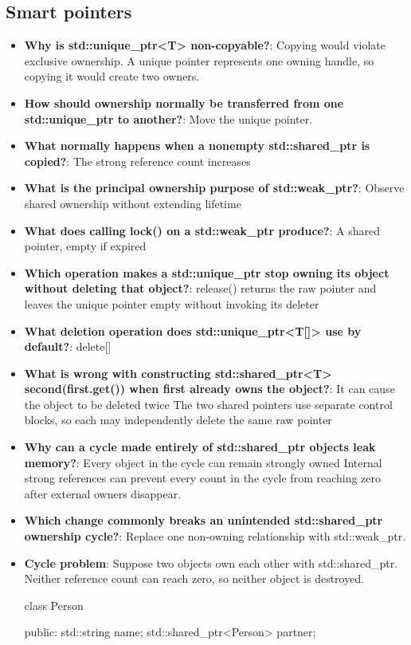 \documentclass{report}
\begin{document}
    \subsection{Smart pointers}
    \begin{itemize}
        \item \textbf{Why is std::unique\_ptr<T> non-copyable?}: Copying would violate exclusive ownership. A unique pointer represents one owning handle, so copying it would create two owners. 
        \item \textbf{How should ownership normally be transferred from one std::unique\_ptr to another?}: Move the unique pointer.
        \item \textbf{What normally happens when a nonempty std::shared\_ptr is copied?}: The strong reference count increases
        \item \textbf{What is the principal ownership purpose of std::weak\_ptr?}: Observe shared ownership without extending lifetime
        \item \textbf{What does calling lock() on a std::weak\_ptr produce?}: A shared pointer, empty if expired
        \item \textbf{Which operation makes a std::unique\_ptr stop owning its object without deleting that object?}: release() returns the raw pointer and leaves the unique pointer empty without invoking its deleter
        \item \textbf{What deletion operation does std::unique\_ptr<T[]> use by default?}: delete[]
        \item \textbf{What is wrong with constructing std::shared\_ptr<T> second(first.get()) when first already owns the object?}: It can cause the object to be deleted twice
            \bigbreak \noindent 
            The two shared pointers use separate control blocks, so each may independently delete the same raw pointer
        \item \textbf{Why can a cycle made entirely of std::shared\_ptr objects leak memory?}: Every object in the cycle can remain strongly owned
            \bigbreak \noindent 
            Internal strong references can prevent every count in the cycle from reaching zero after external owners disappear.
        \item \textbf{Which change commonly breaks an unintended std::shared\_ptr ownership cycle?}: Replace one non-owning relationship with std::weak\_ptr.
        \item \textbf{Cycle problem}: Suppose two objects own each other with std::shared\_ptr. Neither reference count can reach zero, so neither object is destroyed.
            \bigbreak \noindent 
            \begin{cppcode}
                class Person {
                    public:
                    std::string name;
                    std::shared_ptr<Person> partner;

}
\end{cppcode}
\end{itemize}
\end{document}
